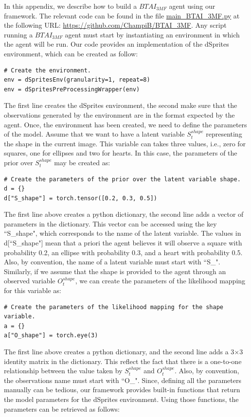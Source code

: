 \documentclass[twoside,11pt]{article}
\begin{document}
In this appendix, we describe how to build a $BTAI_{3MF}$ agent using our framework. The relevant code can be found in the file \url{main_BTAI_3MF.py} at the following URL: \url{https://github.com/ChampiB/BTAI_3MF}. Any script running a $BTAI_{3MF}$ agent must start by instantiating an environment in which the agent will be run. Our code provides an implementation of the dSprites environment, which can be created as follow:
\begin{verbatim}
# Create the environment.
env = dSpritesEnv(granularity=1, repeat=8)
env = dSpritesPreProcessingWrapper(env)
\end{verbatim}
The first line creates the dSprites environment, the second make sure that the observations generated by the environment are in the format expected by the agent. Once, the environment has been created, we need to define the parameters of the model. Assume that we want to have a latent variable $S_t^{shape}$ representing the shape in the current image. This variable can takes three values, i.e., zero for squares, one for ellipses and two for hearts. In this case, the parameters of the prior over $S_t^{shape}$ may be created as:
\begin{verbatim}
# Create the parameters of the prior over the latent variable shape.
d = {}
d["S_shape"] = torch.tensor([0.2, 0.3, 0.5])
\end{verbatim}
The first line above creates a python dictionary, the second line adds a vector of parameters in the dictionary. This vector can be accessed using the key ``S\_shape", which corresponds to the name of the latent variable. The values in d[``S\_shape"] mean that a priori the agent believes it will observe a square with probability 0.2, an ellipse with probability 0.3, and a heart with probability 0.5. Also, by convention, the name of a latent variable must start with ``S\_". Similarly, if we assume that the shape is provided to the agent through an observed variable $O_t^{shape}$, we can create the parameters of the likelihood mapping for this variable as:
\begin{verbatim}
# Create the parameters of the likelihood mapping for the shape variable.
a = {}
a["O_shape"] = torch.eye(3)
\end{verbatim}
The first line above creates a python dictionary, and the second line adds a 3$\times$3 identity matrix in the dictionary. This reflect the fact that there is a one-to-one relationship between the value taken by $S_t^{shape}$ and $O_t^{shape}$. Also, by convention, the observations name must start with ``O\_". Since, defining all the parameters manually can be tedious, our framework provides built-in functions that return the model parameters for the dSprites environment. Using those functions, the parameters can be retrieved as follows:
\end{document}
